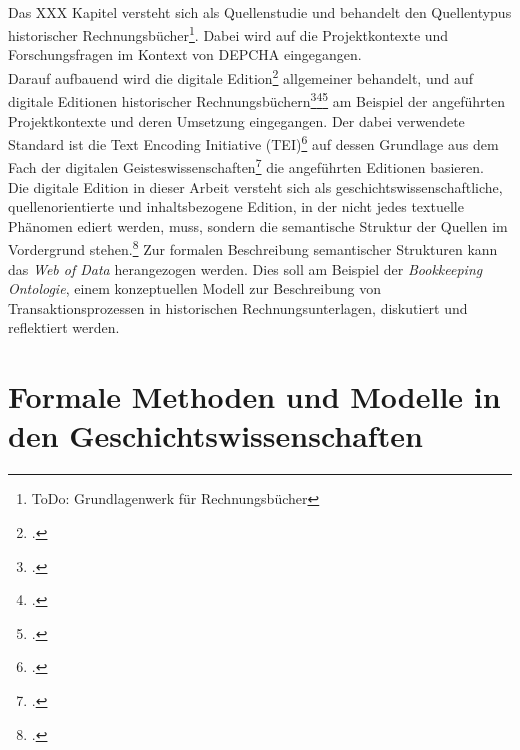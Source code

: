 \documentclass[12pt,a4paper]{article}
\begin{document}
\\
Das XXX Kapitel versteht sich als Quellenstudie und behandelt den Quellentypus historischer Rechnungsbücher\footnote{ToDo: Grundlagenwerk für Rechnungsbücher}. Dabei wird auf die Projektkontexte und Forschungsfragen im Kontext von DEPCHA eingegangen.
\\
Darauf aufbauend wird die digitale Edition\footcite{sahle2013digitale} allgemeiner behandelt, und auf digitale Editionen historischer Rechnungsbüchern\footcite{tomasek2013encoding}\footcite{vogeler2015mittelalterliche}\footcite{vogeler2016content} am Beispiel der angeführten Projektkontexte und deren Umsetzung eingegangen. Der dabei verwendete Standard ist die Text Encoding Initiative (TEI)\footcite{cummings2013text} auf dessen Grundlage aus dem Fach der digitalen Geisteswissenschaften\footcite{jannidis2017digita} die angeführten Editionen basieren. 
\\
Die digitale Edition in dieser Arbeit versteht sich als geschichtswissenschaftliche, quellenorientierte und inhaltsbezogene Edition, in der nicht jedes textuelle Phänomen ediert werden, muss, sondern die semantische Struktur der Quellen im Vordergrund stehen.\footcite{vogeler2019assertive} Zur formalen Beschreibung semantischer Strukturen kann das \textit{Web of Data} herangezogen werden. Dies soll am Beispiel der \textit{Bookkeeping Ontologie}, einem konzeptuellen Modell zur Beschreibung von Transaktionsprozessen in historischen Rechnungsunterlagen, diskutiert und reflektiert werden.

\newpage
\section{Formale Methoden und Modelle in den Geschichtswissenschaften}
\end{document}
